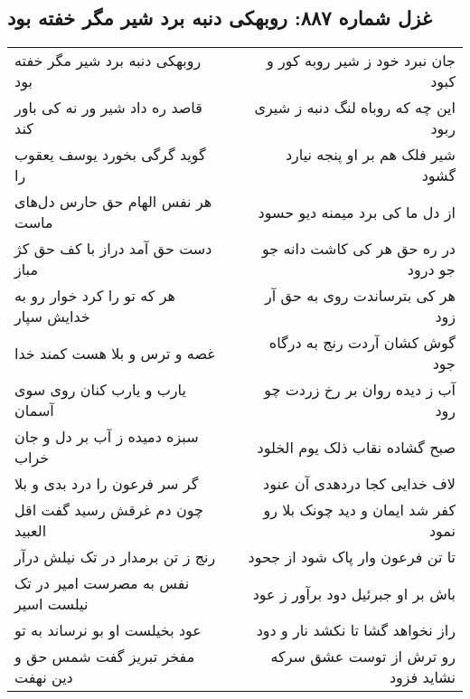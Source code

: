 \begin{center}
\section*{غزل شماره ۸۸۷: روبهکی دنبه برد شیر مگر خفته بود}
\label{sec:0887}
\begin{longtable}{l p{0.5cm} r}
روبهکی دنبه برد شیر مگر خفته بود
&&
جان نبرد خود ز شیر روبه کور و کبود
\\
قاصد ره داد شیر ور نه کی باور کند
&&
این چه که روباه لنگ دنبه ز شیری ربود
\\
گوید گرگی بخورد یوسف یعقوب را
&&
شیر فلک هم بر او پنجه نیارد گشود
\\
هر نفس الهام حق حارس دل‌های ماست
&&
از دل ما کی برد میمنه دیو حسود
\\
دست حق آمد دراز با کف حق کژ مباز
&&
در ره حق هر کی کاشت دانه جو جو درود
\\
هر که تو را کرد خوار رو به خدایش سپار
&&
هر کی بترساندت روی به حق آر زود
\\
غصه و ترس و بلا هست کمند خدا
&&
گوش کشان آردت رنج به درگاه جود
\\
یارب و یارب کنان روی سوی آسمان
&&
آب ز دیده روان بر رخ زردت چو رود
\\
سبزه دمیده ز آب بر دل و جان خراب
&&
صبح گشاده نقاب ذلک یوم الخلود
\\
گر سر فرعون را درد بدی و بلا
&&
لاف خدایی کجا دردهدی آن عنود
\\
چون دم غرقش رسید گفت اقل العبید
&&
کفر شد ایمان و دید چونک بلا رو نمود
\\
رنج ز تن برمدار در تک نیلش درآر
&&
تا تن فرعون وار پاک شود از جحود
\\
نفس به مصرست امیر در تک نیلست اسیر
&&
باش بر او جبرئیل دود برآور ز عود
\\
عود بخیلست او بو نرساند به تو
&&
راز نخواهد گشا تا نکشد نار و دود
\\
مفخر تبریز گفت شمس حق و دین نهفت
&&
رو ترش از توست عشق سرکه نشاید فزود
\\
\end{longtable}
\end{center}
